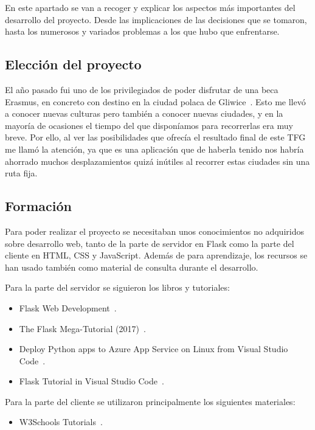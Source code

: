 
En este apartado se van a recoger y explicar los aspectos más importantes del desarrollo del proyecto. Desde las implicaciones de las decisiones que se tomaron, hasta los numerosos y variados problemas a los que hubo que enfrentarse.

\subsection{Elección del proyecto}

El año pasado fui uno de los privilegiados de poder disfrutar de una beca Erasmus, en concreto con destino en la ciudad polaca de Gliwice~\cite{wiki:gliwice}.
Esto me llevó a conocer nuevas culturas pero también a conocer nuevas ciudades, y en la mayoría de ocasiones el tiempo del que disponíamos para recorrerlas era muy breve. Por ello, al ver las posibilidades que ofrecía el resultado final de este TFG me llamó la atención, ya que es una aplicación que de haberla tenido nos habría ahorrado muchos desplazamientos quizá inútiles al recorrer estas ciudades sin una ruta fija.

\subsection{Formación}

Para poder realizar el proyecto se necesitaban unos conocimientos no adquiridos sobre desarrollo web, tanto de la parte de servidor en Flask como la parte del cliente en HTML, CSS y JavaScript. Además de para aprendizaje, los recursos se han usado también como material de consulta durante el desarrollo.

Para la parte del servidor se siguieron los libros y tutoriales:
\begin{itemize}
	\item Flask Web Development~\cite{grinberg2014flask}.
	\item The Flask Mega-Tutorial (2017)~\cite{grinberg-mega}.
	\item Deploy Python apps to Azure App Service on Linux from Visual Studio Code~\cite{deploy-flask-azure}.
	\item Flask Tutorial in Visual Studio Code~\cite{vscode-flask}.
\end{itemize}

Para la parte del cliente se utilizaron principalmente los siguientes
materiales:
\begin{itemize}
	\item W3Schools Tutorials~\cite{w3schools}.
\end{itemize}

